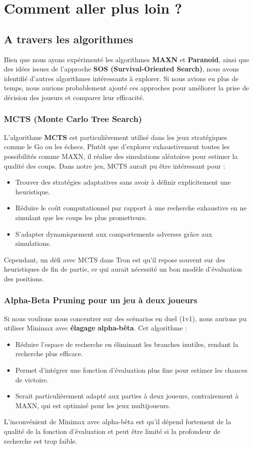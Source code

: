 \section{Comment aller plus loin ?}

\subsection{A travers les algorithmes }
Bien que nous ayons expérimenté les algorithmes \textbf{MAXN} et \textbf{Paranoid}, ainsi que des idées issues de l’approche \textbf{SOS (Survival-Oriented Search)}, nous avons identifié d’autres algorithmes intéressants à explorer. Si nous avions eu plus de temps, nous aurions probablement ajouté ces approches pour améliorer la prise de décision des joueurs et comparer leur efficacité.

\subsubsection{MCTS (Monte Carlo Tree Search)}
L’algorithme \textbf{MCTS} est particulièrement utilisé dans les jeux stratégiques comme le Go ou les échecs. Plutôt que d’explorer exhaustivement toutes les possibilités comme MAXN, il réalise des simulations aléatoires pour estimer la qualité des coups. Dans notre jeu, MCTS aurait pu être intéressant pour :
\begin{itemize}
    \item Trouver des stratégies adaptatives sans avoir à définir explicitement une heuristique.
    \item Réduire le coût computationnel par rapport à une recherche exhaustive en ne simulant que les coups les plus prometteurs.
    \item S’adapter dynamiquement aux comportements adverses grâce aux simulations.
\end{itemize}
Cependant, un défi avec MCTS dans Tron est qu’il repose souvent sur des heuristiques de fin de partie, ce qui aurait nécessité un bon modèle d’évaluation des positions.

\subsubsection{Alpha-Beta Pruning pour un jeu à deux joueurs}
Si nous voulions nous concentrer sur des scénarios en duel (1v1), nous aurions pu utiliser Minimax avec \textbf{élagage alpha-bêta}. Cet algorithme :
\begin{itemize}
    \item Réduire l’espace de recherche en éliminant les branches inutiles, rendant la recherche plus efficace.
    \item Permet d’intégrer une fonction d’évaluation plus fine pour estimer les chances de victoire.
    \item Serait particulièrement adapté aux parties à deux joueurs, contrairement à MAXN, qui est optimisé pour les jeux multijoueurs.
\end{itemize}
L’inconvénient de Minimax avec alpha-bêta est qu’il dépend fortement de la qualité de la fonction d’évaluation et peut être limité si la profondeur de recherche est trop faible.

